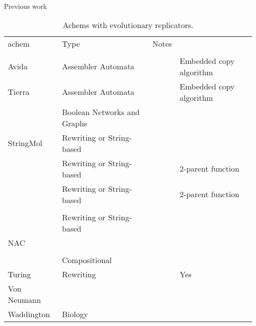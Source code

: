 \begin{sidewaystable}
	\begin{center}
		\scriptsize
		\caption{Previous work}
		\label{tb:previous-work}
		\begin{tabular}{@{}llll@{}}
			\hline\noalign{\smallskip}
			\Gls{achem}                                                     & Type 	& Notes\\ 
			\\ \noalign{\smallskip}
			\hline
			\noalign{\smallskip}
			
			Avida \cite{Ofria2004}                                  		&Assembler Automata&	& Embedded copy algorithm\\
			Tierra \cite{Ray1991}                                  			&Assembler Automata&	& Embedded copy algorithm\\
			\cite{Nellis2012}\cite{Nellis2014}								&Boolean Networks and Graphs&&\\
			StringMol \cite{Hickinbotham2012}                             	&Rewriting or String-based&&\\
			\cite{Fontana1992}												&Rewriting or String-based&&2-parent function\\
			\cite{Dittrich1998}												&Rewriting or String-based&&2-parent function\\
\hline
			\cite{Nowostawski2005}											&&&\\		

			\cite{Fenizio2000}\cite{Fenizio2001}							&Rewriting or String-based&&\\			
			NAC \cite{Suzuki2006}                                         	&&&\\	
			\cite{Gardiner2007}                                             &&&\\
\hline			
			\cite{Kauffman1986}												&Compositional&&\\
			Turing															&Rewriting 	&&Yes\\
			Von Neumann														&&&\\
			Waddington														&Biology&&\\
			\hline
		\end{tabular}
	\end{center}
	\caption{Achems with evolutionary replicators.}
\end{sidewaystable}

